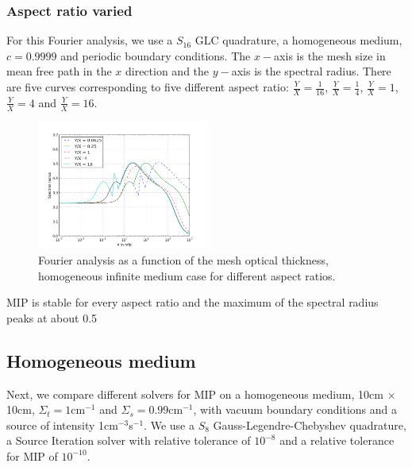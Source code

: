 \subsubsection{Aspect ratio varied}
For this Fourier analysis, we use a $S_{16}$ GLC quadrature, a homogeneous
medium, $c=0.9999$ and periodic boundary conditions. The $x-$axis is the mesh
size in mean free path in the $x$ direction and the $y-$axis is the spectral
radius. There are five curves corresponding to five different aspect ratio:
$\frac{Y}{X}=\frac{1}{16}$, $\frac{Y}{X}=\frac{1}{4}$, $\frac{Y}{X}=1$,
$\frac{Y}{X}=4$ and $\frac{Y}{X}=16$. 
\begin{figure}[H]
\centering
\includegraphics[width=0.5\textwidth]{./Dsa/aspect_ratio_9999}
\caption{Fourier analysis as a function of the mesh optical thickness,
homogeneous infinite medium case for different aspect ratios.}
\end{figure}
MIP is stable for every aspect ratio and the maximum of the spectral radius
peaks at about 0.5

\subsection{Homogeneous medium}
Next, we compare different solvers for MIP on a homogeneous medium, 10cm $\times$
10cm, $\Sigma_t=1$cm$^{-1}$ and $\Sigma_s=0.99$cm$^{-1}$, with vacuum boundary 
conditions and a source of intensity 1cm$^{-3}$s$^{-1}$. We use a $S_8$
Gauss-Legendre-Chebyshev quadrature, a Source Iteration solver with relative
tolerance of $10^{-8}$ and a relative tolerance for MIP of $10^{-10}$.

